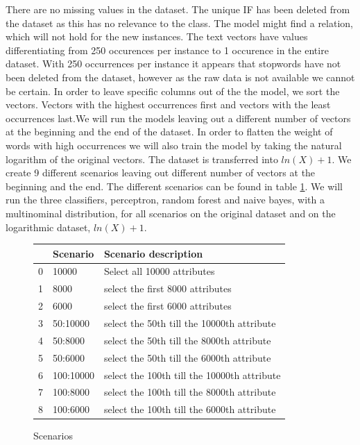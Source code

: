 \documentclass[11pt]{article}
\begin{document}
There are no missing values in the dataset. The unique IF has been deleted from the dataset as this has no relevance to the class. The model might find a relation, which will not hold for the new instances. The text vectors have values differentiating from 250 occurences per instance to 1 occurence in the entire dataset. With 250 occurrences per instance it appears that stopwords have not been deleted from the dataset, however as the raw data is not available we cannot be certain. 
\newline
In order to leave specific columns out of the the model, we sort the vectors. Vectors with the highest occurrences first and vectors with the least occurrences last.We will run the models leaving out a different number of vectors at the beginning and the end of the dataset.
\newline
In order to flatten the weight of words with high occurrences we will also train the model by taking the natural logarithm of the original vectors. The dataset is transferred into $ln(X)+1$.
\newline
We create 9 different scenarios leaving out different number of vectors at the beginning and the end. The different scenarios can be found in table \ref{Tab:: Scenarios}. We will run the three classifiers, perceptron, random forest and naive bayes, with a multinominal distribution, for all scenarios on the original dataset and on the logarithmic dataset, $ln(X)+1$.
\newline
\begin{figure}[h]
\begin{tabular}{lll}
\toprule
{} &   Scenario &  Scenario description \\
\midrule
0 &      10000 & Select all 10000 attributes   \\
1 &       8000 & select the first 8000 attributes  \\
2 &       6000 & select the first 6000 attributes   \\
3 &   50:10000 & select the 50th till the 10000th attribute   \\
4 &    50:8000 & select the 50th till the 8000th attribute    \\
5 &    50:6000 & select the 50th till the 6000th attribute    \\
6 &  100:10000 & select the 100th till the 10000th attribute    \\
7 &   100:8000 & select the 100th till the 8000th attribute    \\
8 &   100:6000 & select the 100th till the 6000th attribute	\\ 
\bottomrule
\end{tabular}
\caption{Scenarios}
\label{Tab:: Scenarios}
\end{figure}
\end{document}
